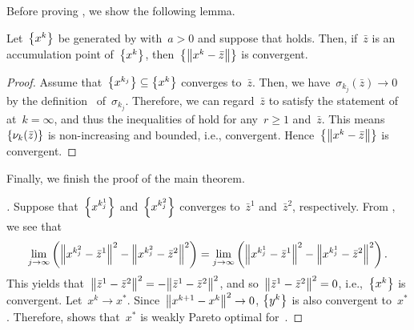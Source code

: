 \documentclass[../main]{subfiles}
\begin{document}
Before proving , we show the following lemma.
\begin{lemma} 
    Let~$\set*{x^k}$ be generated by  with~$a > 0$ and suppose that  holds.
    Then, if~$\bar{z}$ is an accumulation point of~$\set*{x^k}$, then~$\set*{\norm*{x^k - \bar{z}}}$ is convergent.
\end{lemma}
\begin{proof}
    Assume that~$\set*{x^{k_j}} \subseteq \set*{x^k}$ converges to~$\bar{z}$.
    Then, we have~$\sigma_{k_j}(\bar{z}) \to 0$ by the definition~ of~$\sigma_{k_j}$.
    Therefore, we can regard~$\bar{z}$ to satisfy the statement of  at~$k = \infty$, and thus the inequalities of  hold for any~$r \ge 1$ and~$\bar{z}$.
    This means~$\set*{\nu_k(\bar{z})}$ is non-increasing and bounded, i.e., convergent.
    Hence~$\set*{\norm*{x^k - \bar{z}}}$ is convergent.
\end{proof}

Finally, we finish the proof of the main theorem.
\begin{proof}[]
    Suppose that~$\set*{x^{k^1_j}}$ and~$\set*{x^{k^2_j}}$ converges to~$\bar{z}^1$ and~$\bar{z}^2$, respectively.
    From , we see that
    \begin{equation}
        \lim_{j \to \infty} \left( \norm*{x^{k^2_j} - \bar{z}^1}^2 - \norm*{x^{k^2_j} - \bar{z}^2}^2 \right) = \lim_{j \to \infty} \left( \norm*{x^{k^1_j} - \bar{z}^1}^2 - \norm*{x^{k^1_j} - \bar{z}^2}^2 \right) 
    .\end{equation} 
    This yields that~$\norm*{\bar{z}^1 - \bar{z}^2}^2 = - \norm*{\bar{z}^1 - \bar{z}^2}^2$, and so~$\norm*{\bar{z}^1 - \bar{z}^2}^2 = 0$, i.e.,~$\set*{x^k}$ is convergent.
    Let~$x^k \to x^\ast$.
    Since~$\norm*{x^{k + 1} - x^k}^2 \to 0$, $\set*{y^k}$ is also convergent to~$x^\ast$.
    Therefore,  shows that~$x^\ast$ is weakly Pareto optimal for~.
\end{proof}
\end{document}
